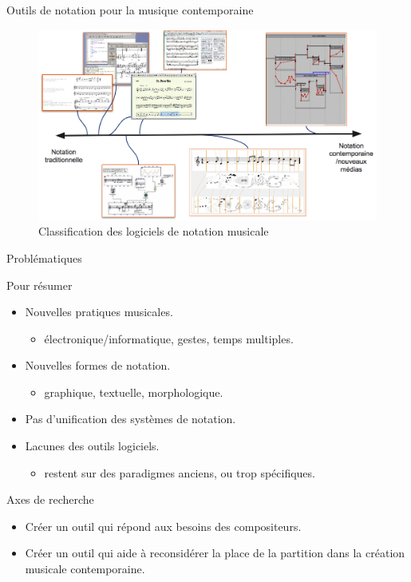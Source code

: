 \documentclass[pdf]{beamer}
\begin{document}
\begin{frame}{Outils de notation pour la musique contemporaine}
	\begin{figure}
			\centering
			\includegraphics[keepaspectratio=true, width=\textwidth]{./medias/classificationLogiciels.png}
			\caption{Classification des logiciels de notation musicale}	
	\end{figure}
\end{frame}

\begin{frame}{Problématiques}
	\begin{block}{Pour résumer} 
		\begin{itemize}[label={$\square$}]
			\item Nouvelles pratiques musicales.
				  \begin{itemize}
				  	\item \small électronique/informatique, gestes, temps multiples.
				  \end{itemize}				   
			\item Nouvelles formes de notation.
				  \begin{itemize}
				  	\item \small graphique, textuelle, morphologique.
				  \end{itemize}
			\item Pas d'unification des systèmes de notation.
			\item Lacunes des outils logiciels.
				  \begin{itemize}
				  	\item \small restent sur des paradigmes anciens, ou trop spécifiques.
				  \end{itemize}
		\end{itemize}
	\end{block}
	\begin{block}{Axes de recherche} 
		\begin{itemize}[label=$\square$]
			\item Créer un outil qui répond aux besoins des compositeurs.
			\item Créer un outil qui aide à reconsidérer la place de la partition dans la création musicale contemporaine.
		\end{itemize}
	\end{block}
\end{frame}
\end{document}
